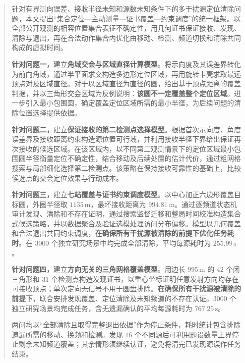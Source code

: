\begin{abstract}
针对有界测向误差、接收半径未知和源数未知条件下的多干扰源定位清除问题，本文提出“集合定位—主动测量—证书覆盖—约束调度”的统一框架。以全部公开观测的相容位置集合表征不确定性，用几何证书保证接收、发现、清除与退出，再在合法动作集合内优化由移动、检测、频道切换和清除共同构成的虚拟时间。

\textbf{针对问题一，}建立\textbf{角域交会与区域直径计算模型}。将示向度及其误差界转化为前向角域，通过半平面求交构造多边形定位区域，再用旋转卡壳求取最远顶点对及区域直径。对于以区域直径为直径的圆，给出基于顶点距离的覆盖判据，并以三角形交会区域为反例说明：\textbf{该圆不一定覆盖整个定位区域}。进一步引入最小包围圆，确定覆盖定位区域所需的最小半径，为后续问题的清除位置选择提供依据。

\textbf{针对问题二，}建立\textbf{保证接收的第二检测点选择模型}。根据首次示向度、角度误差界及接收距离约束构造源位置可行域，并利用接收半径下界给出保证再次接收的候选区域。在该区域内，以不同第二观测情景下的定位区域最小包围圆半径衡量定位不确定性，结合移动及后续处置的估计代价，通过粗网格搜索与局部细化选择第二检测点。该策略在保持接收可靠性的基础上，比较候选点的交会定位效果与行动成本。

\textbf{针对问题三，}建立\textbf{七站覆盖与证书约束调度模型}。以中心加正六边形覆盖目标圆，外圈半径取 $1135\,\mathrm{m}$，最坏接收距离为 $994.81\,\mathrm{m}$。通过逐频道状态机审计发现、清除和不存在证明，通过搜索监督迁移和整局时间校准构造集合式候选策略，并以数据聚合及验证选模处理访问分布偏移。模型以几何覆盖和合法退出共同约束调度，\textbf{在确保所有干扰源被清除的前提下优化任务耗时}。在 $3000$ 个独立研究场景中均完成全部清除，平均每源耗时为 $255.99\,\mathrm{s}$。

\textbf{针对问题四，}建立\textbf{方向无关的三角网格覆盖模型}。用边长 $995\,\mathrm{m}$ 的 $42$ 个闭三角形和 $31$ 个检测点构造发现证书，以重心坐标证明任意发射方向均存在可接收顶点；单次定向无信号不用于圆盘排除。\textbf{在确保所有干扰源被清除的前提下}，联合安排发现覆盖、定位清除及未知频道的不存在认证。$3000$ 个独立研究场景均完成任务，含无遗漏确认的平均每源耗时为 $767.25\,\mathrm{s}$。

两问均以“全部清除且取得完整退出依据”作为停止条件，耗时统计包含排除遗漏所需的移动、换频和检测。发现 $16$ 个不同源后可利用题设数量上界停止剩余未知频道覆盖；其余情形须继续认证，避免将清完已发现源误作任务结束。

\end{abstract}
